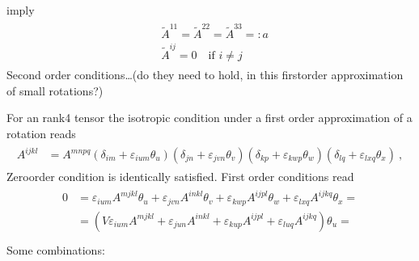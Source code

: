 \documentclass[letterpaper,10pt,english]{jupyterBook}
\begin{document}
\sphinxAtStartPar
imply
\begin{equation*}
\begin{split}\begin{aligned}
  & \widetilde{A}^{11} = \widetilde{A}^{22} = \widetilde{A}^{33} =: a \\
  & \widetilde{A}^{ij} = 0 \quad \text{if $i \ne j$}
\end{aligned}\end{split}
\end{equation*}
\sphinxAtStartPar
Second order conditions…(do they need to hold, in this first\sphinxhyphen{}order approximation of small rotations?)



\sphinxAtStartPar
{} For an rank\sphinxhyphen{}4 tensor the isotropic condition under a first order approximation of a rotation reads
\begin{equation*}
\begin{split}\begin{aligned}
  A^{ijkl} 
  & = A^{mnpq} \left( \delta_{im} + \varepsilon_{ium} \theta_u  \right) 
               \left( \delta_{jn} + \varepsilon_{jvn} \theta_v  \right) 
               \left( \delta_{kp} + \varepsilon_{kwp} \theta_w  \right) 
               \left( \delta_{lq} + \varepsilon_{lxq} \theta_x  \right) \ ,
\end{aligned}\end{split}
\end{equation*}
\sphinxAtStartPar
Zero\sphinxhyphen{}order condition is identically satisfied. First order conditions read
\begin{equation*}
\begin{split}\begin{aligned}
  0 & =
  \varepsilon_{ium} A^{mjkl} \theta_u + 
  \varepsilon_{jvn} A^{inkl} \theta_v + 
  \varepsilon_{kwp} A^{ijpl} \theta_w + 
  \varepsilon_{lxq} A^{ijkq} \theta_x = \\
  & = \left(  V
  \varepsilon_{ium} A^{mjkl} + 
  \varepsilon_{jun} A^{inkl} + 
  \varepsilon_{kup} A^{ijpl} + 
  \varepsilon_{luq} A^{ijkq}
  \right) \theta_u = \\
\end{aligned}\end{split}
\end{equation*}
\sphinxAtStartPar
Some combinations:
\end{document}
